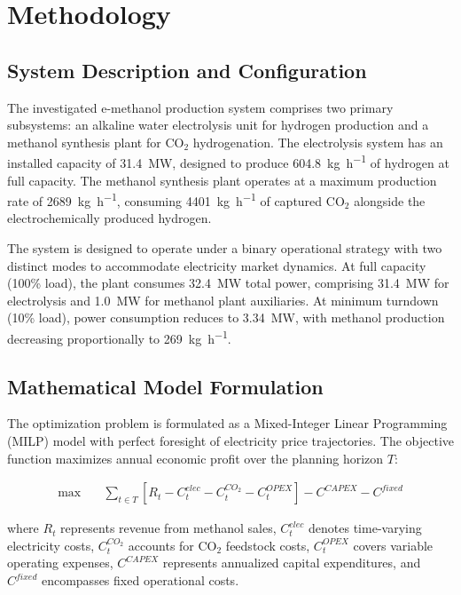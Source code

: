 \documentclass[12pt,a4paper]{article}
\begin{document}
\section{Methodology}

\subsection{System Description and Configuration}

The investigated e-methanol production system comprises two primary subsystems: an alkaline water electrolysis unit for hydrogen production and a methanol synthesis plant for CO$_2$ hydrogenation. The electrolysis system has an installed capacity of \SI{31.4}{\mega\watt}, designed to produce \SI{604.8}{\kg\per\hour} of hydrogen at full capacity. The methanol synthesis plant operates at a maximum production rate of \SI{2689}{\kg\per\hour}, consuming \SI{4401}{\kg\per\hour} of captured CO$_2$ alongside the electrochemically produced hydrogen.

The system is designed to operate under a binary operational strategy with two distinct modes to accommodate electricity market dynamics. At full capacity (100\% load), the plant consumes \SI{32.4}{\mega\watt} total power, comprising \SI{31.4}{\mega\watt} for electrolysis and \SI{1.0}{\mega\watt} for methanol plant auxiliaries. At minimum turndown (10\% load), power consumption reduces to \SI{3.34}{\mega\watt}, with methanol production decreasing proportionally to \SI{269}{\kg\per\hour}.

\subsection{Mathematical Model Formulation}

The optimization problem is formulated as a Mixed-Integer Linear Programming (MILP) model with perfect foresight of electricity price trajectories. The objective function maximizes annual economic profit over the planning horizon $T$:

\begin{align}
\max \quad & \sum_{t \in T} \left[ R_t - C_t^{elec} - C_t^{CO_2} - C_t^{OPEX} \right] - C^{CAPEX} - C^{fixed}
\end{align}

where $R_t$ represents revenue from methanol sales, $C_t^{elec}$ denotes time-varying electricity costs, $C_t^{CO_2}$ accounts for CO$_2$ feedstock costs, $C_t^{OPEX}$ covers variable operating expenses, $C^{CAPEX}$ represents annualized capital expenditures, and $C^{fixed}$ encompasses fixed operational costs.
\end{document}
